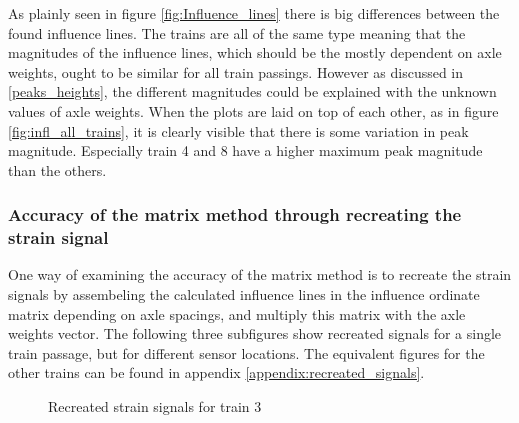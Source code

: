 As plainly seen in figure \ref{fig:Influence_lines} there is big differences between the found influence lines. The trains are all of the same type meaning that the magnitudes of the influence lines, which should be the mostly dependent on axle weights, ought to be similar for all train passings. However as discussed in \ref{peaks_heights}, the different magnitudes could be explained with the unknown values of axle weights. When the plots are laid on top of each other, as in figure \ref{fig:infl_all_trains}, it is clearly visible that there is some variation in peak magnitude. Especially train 4 and 8 have a higher maximum peak magnitude than the others.

\subsubsection{Accuracy of the matrix method through recreating the strain signal}
One way of examining the accuracy of the matrix method is to recreate the strain signals by assembeling the calculated influence lines in the influence ordinate matrix depending on axle spacings, and multiply this matrix with the axle weights vector. The following three subfigures show recreated signals for a single train passage, but for different sensor locations. The equivalent figures for the other trains can be found in appendix \ref{appendix:recreated_signals}.
\begin{figure}[H]
	\begin{subfigure}[t]{0.9\textwidth}
			
		\label{recreated_sensor_trond_train3}
	\end{subfigure}

	\begin{subfigure}[t]{0.9\textwidth}
			
		\label{recreated_sensor_middle_train3}
	\end{subfigure}

	\begin{subfigure}[t]{0.9\textwidth}
			
		\label{recreated_sensor_heimdal_train3}
	\end{subfigure}
	\caption{Recreated strain signals for train 3}
	\label{fig:recreated_strains}
\end{figure}
